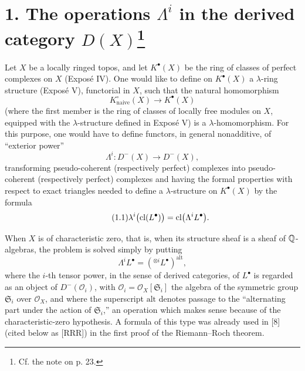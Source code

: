 \section*{1. The operations $\Lambda^i$ in the derived category $D(X)$\footnote{Cf. the note on p. 23.}}

Let $X$ be a locally ringed topos, and let $K^\bullet(X)$ be the ring of classes of perfect complexes on $X$ (Expos\'e IV). One would like to define on $K^\bullet(X)$ a $\lambda$-ring structure (Expos\'e V), functorial in $X$, such that the natural homomorphism
\[
  K^\circ_{\mathrm{naive}}(X)\longrightarrow K^\bullet(X)
\]
(where the first member is the ring of classes of locally free modules on $X$, equipped with the $\lambda$-structure defined in Expos\'e V) is a $\lambda$-homomorphism. For this purpose, one would have to define functors, in general nonadditive, of ``exterior power''
\[
  \Lambda^i:D^-(X)\longrightarrow D^-(X),
\]
transforming pseudo-coherent (respectively perfect) complexes into pseudo-coherent (respectively perfect) complexes and having the formal properties with respect to exact triangles needed to define a $\lambda$-structure on $K^\bullet(X)$ by the formula
\begin{equation}\tag{1.1}
  \lambda^i\bigl(\operatorname{cl}(L^\bullet)\bigr)
  =\operatorname{cl}\bigl(\Lambda^iL^\bullet\bigr).
\end{equation}

When $X$ is of characteristic zero, that is, when its structure sheaf is a sheaf of $\mathbb Q$-algebras, the problem is solved simply by putting
\begin{equation}\tag{1.2}
  \Lambda^iL^\bullet
  =\left({}^{\otimes i}L^\bullet\right)^{\mathrm{alt}},
\end{equation}
where the $i$-th tensor power, in the sense of derived categories, of
$L^\bullet$ is regarded as an object of $D^-(\mathcal O_i)$, with
$\mathcal O_i=\mathcal O_X[\mathfrak S_i]$ the algebra of the symmetric
group $\mathfrak S_i$ over $\mathcal O_X$, and where the superscript
\(\mathrm{alt}\) denotes passage to the ``alternating part under the
action of $\mathfrak S_i$,'' an operation which makes sense because of
the characteristic-zero hypothesis. A formula of this type was already
used in [8] (cited below as [RRR]) in the first proof of the
Riemann--Roch theorem.

